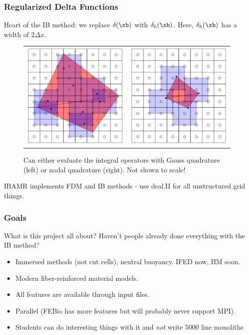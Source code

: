 \documentclass[8pt]{beamer}
\begin{document}
\begin{frame}
    \frametitle{Regularized Delta Functions} Heart of the IB method: we replace
    $\delta(\xb)$ with $\delta_h(\xb)$. Here, $\delta_h(\xb)$ has a width of $2 \Delta x$.

    \begin{figure}
      \centering
      \begin{tabular}{c c}
        \includegraphics[width=0.4\linewidth]{interactionstencils/elemental_stencil.pdf} &
        \includegraphics[width=0.4\linewidth]{interactionstencils/nodal_stencil.pdf}
      \end{tabular}

      Can either evaluate the integral operators with Gauss quadrature (left) or
      nodal quadrature (right). Not shown to scale!
    \end{figure}

    IBAMR implements FDM and IB methods - use deal.II for all unstructured grid things.
\end{frame}

\begin{frame}
    \frametitle{Goals}
    What is this project all about? Haven't people already done everything with the IB method?
    \begin{itemize}
      \item Immersed methods (not cut cells), neutral buoyancy. IFED now, IIM soon.
      \item Modern fiber-reinforced material models.
      \item All features are available through input files.
      \item Parallel (FEBio has more features but will probably never support MPI).
      \item Students can do interesting things with it and \emph{not} write 5000 line monoliths
    \end{itemize}
\end{frame}
\end{document}
